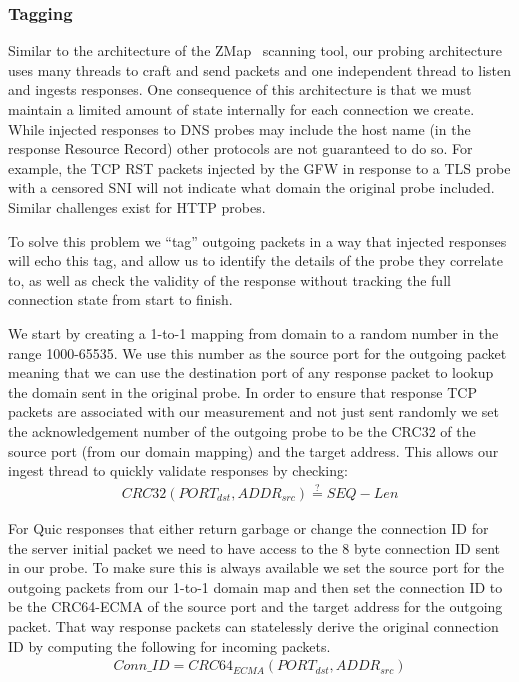 \subsubsection{Tagging}

Similar to the architecture of the ZMap~\cite{zmap} scanning tool, our probing architecture
uses many threads to craft and send packets and one independent thread to listen
and ingests responses. One consequence of this architecture is that we must
maintain a limited amount of state internally for each connection we create.
While injected responses to DNS probes may include the host name (in the
response Resource Record) other protocols are not guaranteed to do so. For
example, the TCP RST packets injected by the GFW in response to a TLS probe with
a censored SNI will not indicate what domain the original probe included.
Similar challenges exist for HTTP probes.

To solve this problem we ``tag'' outgoing packets in a way that injected
responses will echo this tag, and allow us to identify the details of the probe
they correlate to, as well as check the
validity of the response without tracking the full connection state from start
to finish.

We start by creating a 1-to-1 mapping from domain to a random number in the
range 1000-65535. We use this number as the source port for the outgoing packet
meaning that we can use the destination port of any response packet to lookup
the domain sent in the original probe. In order to ensure that response TCP
packets are associated with our measurement and not just sent randomly we set
the acknowledgement number of the outgoing probe to be the CRC32 of the source
port (from our domain mapping) and the target address. This allows our ingest
thread to quickly validate responses by checking:
\begin{gather*}
CRC32(PORT_{dst},ADDR_{src}) \stackrel{?}{=} SEQ - Len
\end{gather*}

For Quic responses that either return garbage or change the connection ID for
the server initial packet we need to have access to the 8 byte connection ID
sent in our probe. To make sure this is always available we set the source port
for the outgoing packets from our 1-to-1 domain map and then set the connection
ID to be the CRC64-ECMA of the source port and the target address for the
outgoing packet. That way response packets can statelessly derive the original
connection ID by computing the following for incoming packets.
\begin{gather*}
Conn\_ID = CRC64_{ECMA}(PORT_{dst},ADDR_{src})
\end{gather*}
\fi

